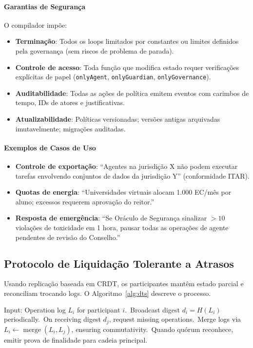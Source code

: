 \documentclass[11pt]{article}
\begin{document}
\paragraph{Garantias de Segurança} O compilador impõe:
\begin{itemize}[noitemsep]
  \item \textbf{Terminação}: Todos os loops limitados por constantes ou limites definidos pela governança (sem riscos de problema de parada).
  \item \textbf{Controle de acesso}: Toda função que modifica estado requer verificações explícitas de papel (\texttt{onlyAgent}, \texttt{onlyGuardian}, \texttt{onlyGovernance}).
  \item \textbf{Auditabilidade}: Todas as ações de política emitem eventos com carimbos de tempo, IDs de atores e justificativas.
  \item \textbf{Atualizabilidade}: Políticas versionadas; versões antigas arquivadas imutavelmente; migrações auditadas.
\end{itemize}

\paragraph{Exemplos de Casos de Uso}
\begin{itemize}[noitemsep]
  \item \textbf{Controle de exportação}: ``Agentes na jurisdição X não podem executar tarefas envolvendo conjuntos de dados da jurisdição Y'' (conformidade ITAR).
  \item \textbf{Quotas de energia}: ``Universidades virtuais alocam 1.000 EC/mês por aluno; excessos requerem aprovação do reitor.''
  \item \textbf{Resposta de emergência}: ``Se Oráculo de Segurança sinalizar $>10$ violações de toxicidade em 1 hora, pausar todas as operações de agente pendentes de revisão do Conselho.''
\end{itemize}

\subsection{Protocolo de Liquidação Tolerante a Atrasos}
Usando replicação baseada em CRDT, os participantes mantêm estado parcial e reconciliam trocando logs. O Algoritmo~\ref{alg:dts} descreve o processo.

\begin{algorithm}[H]
  \caption{Delay-Tolerant Settlement (DTS)}
  \label{alg:dts}
  \begin{algorithmic}[1]
    \STATE Input: Operation log $L_i$ for participant $i$.\
    \STATE Broadcast digest $d_i = H(L_i)$ periodically.\
    \STATE On receiving digest $d_j$, request missing operations.\
    \STATE Merge logs via $L_i \leftarrow \operatorname{merge}(L_i, L_j)$, ensuring commutativity.\
    \STATE Quando quórum reconhece, emitir prova de finalidade para cadeia principal.\
  \end{algorithmic}
\end{algorithm}
\end{document}
